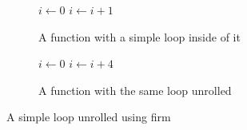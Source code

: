 \begin{figure}[H]
    \begin{subfigure}[b]{0.5\textwidth}
        \centering
        \begin{algorithmic}
                \State $i \gets 0$
                    \State {}
                    \State $i \gets i + 1$
                \EndWhile
            \EndFunction
        \end{algorithmic}
        \caption{A function with a simple loop inside of it}
    \end{subfigure}
    \begin{subfigure}[b]{0.5\textwidth}
        \centering
        \begin{algorithmic}
                \State $i \gets 0$
                    \State {}
                    \State {}
                    \State {}
                    \State {}
                    \State $i \gets i + 4$
                \EndWhile
            \EndFunction
        \end{algorithmic}
        \caption{A function with the same loop unrolled}
    \end{subfigure}
    \caption{A simple loop unrolled using firm}
    \label{fig:basics:old-loop-unrolling}
\end{figure}